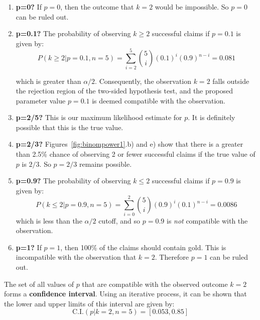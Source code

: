 \begin{enumerate}
\item{\bf p=0?} If $p=0$, then the outcome that $k=2$ would be
  impossible.  So $p=0$ can be ruled out.
\item{\bf p=0.1?} The probability of observing ${k}\geq{2}$ successful
  claims if $p=0.1$ is given by:
  \[
  P({k}\geq{2}|p=0.1,n=5) =
  \sum\limits_{i=2}^{5}\binom{5}{i}(0.1)^i(0.9)^{n-i} = 0.081
  \]
  
  which is greater than $\alpha/2$. Consequently, the observation
  $k=2$ falls outside the rejection region of the two-sided hypothesis
  test, and the proposed parameter value $p=0.1$ is deemed compatible
  with the observation.
\item{\bf p=2/5?} This is our maximum likelihood estimate for $p$.  It
  is definitely possible that this is the true value.
\item{\bf p=2/3?} Figures~\ref{fig:binompower1}.b) and e) show that
  there is a greater than 2.5\% chance of observing 2 or fewer
  successful claims if the true value of $p$ is $2/3$. So $p=2/3$
  remains possible.
\item{\bf p=0.9?} The probability of observing ${k}\leq{2}$ successful
  claims if $p=0.9$ is given by:
  \[
  P({k}\leq{2}|p=0.9,n=5) =
  \sum\limits_{i=0}^{2}\binom{5}{i}(0.9)^i(0.1)^{n-i} = 0.0086
  \]
  which is less than the $\alpha/2$ cutoff, and so $p=0.9$ is
  \emph{not} compatible with the observation.
\item{\bf p=1?} If $p=1$, then 100\% of the claims should contain
  gold. This is incompatible with the observation that $k=2$.
  Therefore $p=1$ can be ruled out.
\end{enumerate}

The set of all values of $p$ that are compatible with the observed
outcome $k=2$ forms a \textbf{confidence interval}. Using an iterative
process, it can be shown that the lower and upper limits of this
interval are given by:
\[
\mbox{C.I.}(p|k=2,n=5) = [0.053, 0.85]
\]

